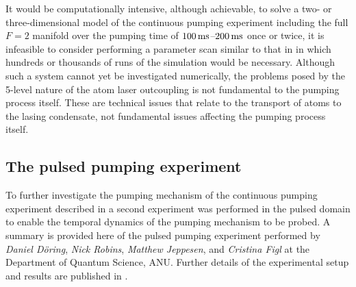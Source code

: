 It would be computationally intensive, although achievable, to solve a two- or three-dimensional model of the continuous pumping experiment including the full $F=2$ manifold over the pumping time of $\unit[100]{ms}$--$\unit[200]{ms}$ once or twice, it is infeasible to consider performing a parameter scan similar to that in  in which hundreds or thousands of runs of the simulation would be necessary.  Although such a system cannot yet be investigated numerically, the problems posed by the 5-level nature of the atom laser outcoupling is not fundamental to the pumping process itself.  These are technical issues that relate to the transport of atoms to the lasing condensate, not fundamental issues affecting the pumping process itself.


\subsection{The pulsed pumping experiment}
\label{OpticalPumping:PulsedPumpingExperiment}

To further investigate the pumping mechanism of the continuous pumping experiment described in  a second experiment was performed in the pulsed domain to enable the temporal dynamics of the pumping mechanism to be probed.  A summary is provided here of the pulsed pumping experiment performed by \emph{Daniel Döring}, \emph{Nick Robins}, \emph{Matthew Jeppesen}, and \emph{Cristina Figl} at the Department of Quantum Science, ANU.  Further details of the experimental setup and results are published in \citep{Doring:2009}.  

\parasep

